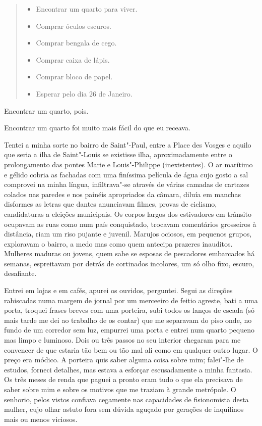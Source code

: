 \begin{quote}
\begin{itemize}
\item Encontrar um quarto para viver.

\item Comprar óculos escuros.

\item Comprar bengala de cego.

\item Comprar caixa de lápis.

\item Comprar bloco de papel.

\item Esperar pelo dia 26 de Janeiro.
\end{itemize}
\end{quote}

Encontrar um quarto, pois.

Encontrar um quarto foi muito mais fácil do que eu receava.

Tentei a minha sorte no bairro de Saint"-Paul, entre a Place des Vosges e
aquilo que seria a ilha de Saint"-Louis se existisse ilha,
aproximadamente entre o prolongamento das pontes Marie e Louis"-Philippe
(inexistentes). O ar marítimo e gélido cobria as fachadas com uma
finíssima película de água cujo gosto a sal comprovei na minha língua,
infiltrava"-se através de várias camadas de cartazes colados nas paredes
e nos painéis apropriados da câmara, diluía em manchas disformes as
letras que dantes anunciavam filmes, provas de ciclismo, candidaturas
a eleições municipais. Os corpos largos dos estivadores em trânsito
ocupavam as ruas como num país conquistado, trocavam comentários
grosseiros à distância, riam um riso pujante e juvenil. Marujos ociosos,
em pequenos grupos, exploravam o bairro, a medo mas como quem antecipa
prazeres inauditos. Mulheres maduras ou jovens, quem sabe se esposas
de pescadores embarcados há semanas, espreitavam por detrás de
cortinados incolores, um só olho fixo, escuro, desafiante.

Entrei em lojas e em cafés, apurei os ouvidos, perguntei. Segui as
direções rabiscadas numa margem de jornal por um merceeiro de feitio
agreste, bati a uma porta, troquei frases breves com uma porteira, subi
todos os lanços de escada (só mais tarde me dei ao trabalho de os
contar) que me separavam do piso onde, no fundo de um corredor sem luz,
empurrei uma porta e entrei num quarto pequeno mas limpo e luminoso.
Dois ou três passos no seu interior chegaram para me convencer de que
estaria tão bem ou tão mal ali como em qualquer outro lugar. O preço era
módico. A porteira quis saber alguma coisa sobre mim; falei"-lhe de
estudos, forneci detalhes, mas estava a esforçar escusadamente a minha
fantasia. Os três meses de renda que paguei a pronto eram tudo o que
ela precisava de saber sobre mim e sobre os motivos que me traziam à
grande metrópole. O senhorio, pelos vistos confiava cegamente nas
capacidades de fisionomista desta mulher, cujo olhar astuto fora sem
dúvida aguçado por gerações de inquilinos mais ou menos viciosos.

